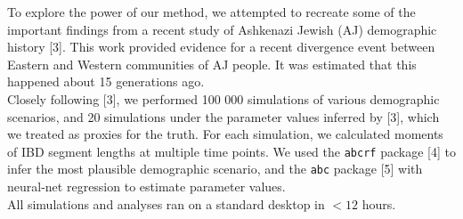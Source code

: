 \documentclass[25pt, a0paper, portrait, margin=0mm, innermargin=15mm,
     blockverticalspace=15mm, colspace=15mm, subcolspace=8mm]{tikzposter} %
\begin{document}
\begin{columns}
{{\fontsize{34}{35}\selectfont To explore the power of our method, we attempted to recreate some of the important findings from a recent study of Ashkenazi Jewish (AJ) demographic history [3]. This work provided evidence for a recent divergence event between Eastern and Western communities of AJ people. It was estimated that this happened about 15 generations ago.\\[2mm]
Closely following [3], we performed 100 000 simulations of various demographic scenarios, and 20 simulations under the parameter values inferred by [3], which we treated as proxies for the truth. For each simulation, we calculated moments of IBD segment lengths at multiple time points. We used the \texttt{abcrf} package [4] to infer the most plausible demographic scenario, and the \texttt{abc} package [5] with neural-net regression to estimate parameter values.\\
All simulations and analyses ran on a standard desktop in $<12$ hours.
}
}
     \end{columns}
\end{document}
